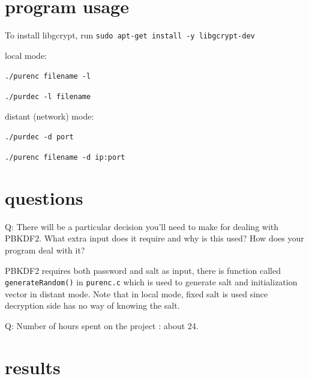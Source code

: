 \documentclass[11pt, oneside]{article}   	%
\begin{document}
\section{program usage}
To install libgcrypt, run \verb|sudo apt-get install -y libgcrypt-dev|

local mode:

\verb|./purenc filename -l|

\verb|./purdec -l filename|

distant (network) mode:

\verb|./purdec -d port|

\verb|./purenc filename -d ip:port|

\section{questions}
Q: There will be a particular decision you’ll need to make for dealing with PBKDF2. What extra input does it require and why is this used? How does your program deal with it?

PBKDF2 requires both password and salt as input, there is function called \texttt{generateRandom()} in \texttt{purenc.c} which is used to generate salt and initialization vector in distant mode. Note that in local mode, fixed salt is used since decryption side has no way of knowing the salt.


Q: Number of hours spent on the project : about 24.

\section{results}
\end{document}
